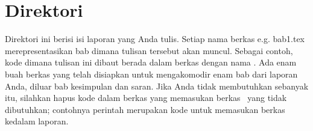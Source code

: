 \section{Direktori }
\label{sec:bab-tex}
Direktori ini berisi isi laporan yang Anda tulis.
Setiap nama berkas e.g. bab1.tex merepresentasikan bab dimana tulisan tersebut akan muncul.
Sebagai contoh, kode dimana tulisan ini dibaut berada dalam berkas dengan nama .
Ada enam buah berkas yang telah disiapkan untuk mengakomodir enam bab dari laporan Anda, diluar bab kesimpulan dan saran.
Jika Anda tidak membutuhkan sebanyak itu, silahkan hapus kode dalam berkas  yang memasukan berkas \latex~yang tidak dibutuhkan;
contohnya perintah  merupakan kode untuk memasukan berkas  kedalam laporan.
